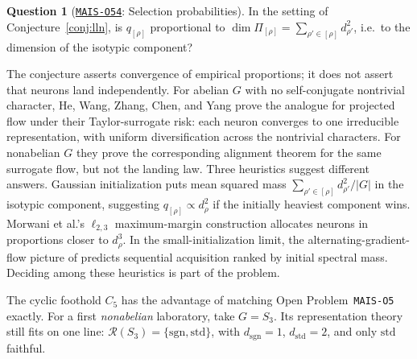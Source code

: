 \documentclass[11pt]{amsart}
\newcommand{\Oid}[1]{\href{https://github.com/lionellevine/MAIS/blob/main/open-problems/MAIS-O#1.md}{\texttt{MAIS-O#1}}}
\theoremstyle{plain}
\theoremstyle{definition}
\newtheorem{question}[theorem]{Question}
\newcommand{\Rcl}{\mathcal{R}}
\begin{document}
\begin{question}[\Oid{54}: Selection probabilities]\label{q:dsquared}
In the setting of Conjecture~\ref{conj:lln}, is $q_{[\rho]}$ proportional to $\dim \Pi_{[\rho]} = \sum_{\rho' \in [\rho]} d_{\rho'}^2$, i.e.\ to the dimension of the isotypic component?
\end{question}

The conjecture asserts convergence of empirical proportions; it does not assert that neurons land independently. For abelian $G$ with no self-conjugate nontrivial character, He, Wang, Zhang, Chen, and Yang \cite{he2026spectral} prove the analogue for projected flow under their Taylor-surrogate risk: each neuron converges to one irreducible representation, with uniform diversification across the nontrivial characters. For nonabelian $G$ they prove the corresponding alignment theorem for the same surrogate flow, but not the landing law. Three heuristics suggest different answers. Gaussian initialization puts mean squared mass $\sum_{\rho' \in [\rho]} d_{\rho'}^2/|G|$ in the isotypic component, suggesting $q_{[\rho]}\propto d_\rho^2$ if the initially heaviest component wins. Morwani et al.'s $\ell_{2,3}$ maximum-margin construction allocates neurons in proportions closer to $d_\rho^3$. In the small-initialization limit, the alternating-gradient-flow picture of \cite{kunin2025} predicts sequential acquisition ranked by initial spectral mass. Deciding among these heuristics is part of the problem.

The cyclic foothold $C_5$ has the advantage of matching Open Problem~\texttt{MAIS-O5} exactly. For a first \emph{nonabelian} laboratory, take $G=S_3$. Its representation theory still fits on one line: $\Rcl(S_3) = \{\mathrm{sgn}, \mathrm{std}\}$, with $d_{\mathrm{sgn}} = 1$, $d_{\mathrm{std}} = 2$, and only $\mathrm{std}$ faithful.
\end{document}
